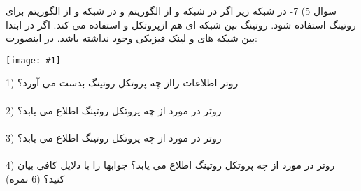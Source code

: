 \documentclass[10pt,letterpaper]{article}
\newcommand{\pic}[2]{
\begin{center}
\texttt{[image: \#1]}
\end{center}
}
\begin{document}
سوال 5) 7-	در شبکه زیر اگر در شبکه  و  از الگوریتم   و در شبکه  و  از الگوریتم   برای روتینگ    استفاده شود. روتینگ بین شبکه ای هم ازپروتکل   و   استفاده می کند. اگر در ابتدا بین شبکه های   و  لینک فیزیکی وجود نداشته باشد. در اینصورت:
\pic{Q6}{110mm}

1)	روتر  اطلاعات    رااز چه پروتکل روتینگ بدست می آورد؟
\\
\\
2)	روتر   در مورد   از چه پروتکل روتینگ اطلاع می یابد؟
\\
\\
3)	روتر   در مورد   از چه پروتکل روتینگ اطلاع می یابد؟
\\
\\
4)	روتر   در مورد  از چه پروتکل روتینگ اطلاع می یابد؟
جوابها را با دلایل کافی بیان کنید؟ (6 نمره)
\end{document}
